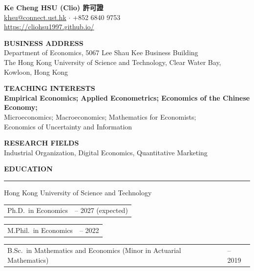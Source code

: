 \documentclass[11pt,letterpaper]{article}
\makeatletter
\newlength{\cvdatecol}
\newcommand{\sectionheader}[1]{%
  \vspace{0.32em}
  {\large\bfseries #1}\\[-0.15em]
  \rule{\textwidth}{0.4pt}\par
  \vspace{0.18em}
}
\newcommand{\cvline}[3][0em]{%
  \par\nobreak
  \noindent\hspace*{#1}%
  \begin{tabularx}{\dimexpr\textwidth-#1\relax}{@{}X@{\hspace{0.75em}}>{\raggedleft\arraybackslash}p{\cvdatecol}@{}}
  #2 & #3 \\
  \end{tabularx}%
}
\makeatother
\begin{document}
\begin{center}
{\LARGE\bfseries Ke Cheng HSU (Clio) 許可證}\\[0.45em]
\href{mailto:khsu@connect.ust.hk}{khsu@connect.ust.hk} $\cdot$ +852 6840 9753\\[0.12em]
\href{https://cliohsu1997.github.io}{https://cliohsu1997.github.io/}
\end{center}

\vspace{0.4em}

\textbf{BUSINESS ADDRESS}\\[0.12em]
\hspace{1.5em} Department of Economics, 5067 Lee Shau Kee Business Building\\
\hspace{1.5em} The Hong Kong University of Science and Technology, Clear Water Bay, Kowloon, Hong Kong

\vspace{0.35em}

\textbf{TEACHING INTERESTS}\\[0.12em]
\hspace{1.5em} \textbf{Empirical Economics; Applied Econometrics; Economics of the Chinese Economy;}\\
\hspace{1.5em} Microeconomics; Macroeconomics; Mathematics for Economists;\\
\hspace{1.5em} Economics of Uncertainty and Information

\vspace{0.2em}

\textbf{RESEARCH FIELDS}\\[0.12em]
\hspace{1.5em} Industrial Organization, Digital Economics, Quantitative Marketing

\sectionheader{EDUCATION}
{
Hong Kong University of Science and Technology\\[-0.3em]
\cvline[1.5em]{Ph.D.\ in Economics}{2022 -- 2027 (expected)}
\vspace{-0.12em}
\cvline[1.5em]{M.Phil.\ in Economics}{2020 -- 2022}
\vspace{-0.12em}
\cvline[1.5em]{B.Sc.\ in Mathematics and Economics (Minor in Actuarial Mathematics)}{2015 -- 2019}
}
\end{document}
